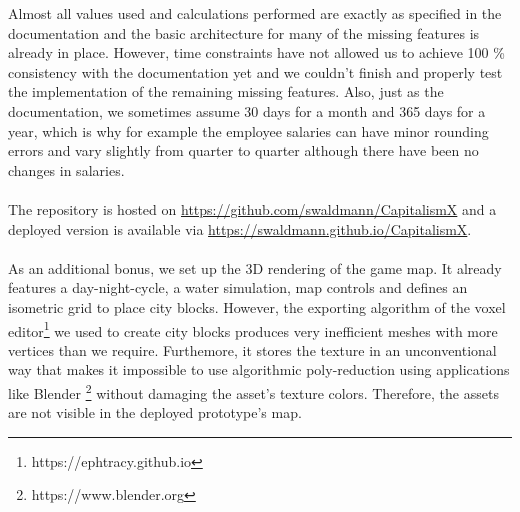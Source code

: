 Almost all values used and calculations performed are exactly as specified in the documentation and the basic architecture for many of the missing features is already in place. However, time constraints have not allowed us to achieve 100 \% consistency with the documentation yet and we couldn't finish and properly test the implementation of the remaining missing features. Also, just as the documentation, we sometimes assume 30 days for a month and 365 days for a year, which is why for example the employee salaries can have minor rounding errors and vary slightly from quarter to quarter although there have been no changes in salaries.\\\\
The repository is hosted on \href{https://github.com/swaldmann/CapitalismX}{https://github.com/swaldmann/CapitalismX} and a deployed version is available via \href{https://swaldmann.github.io/CapitalismX}{https://swaldmann.github.io/CapitalismX}.\\\\
As an additional bonus, we set up the 3D rendering of the game map. It already features a day-night-cycle, a water simulation, map controls and defines an isometric grid to place city blocks.  However,  the  exporting  algorithm  of  the voxel editor\footnote{https://ephtracy.github.io} we used to create city blocks produces very inefficient meshes with more vertices than we require. Furthemore, it stores the texture in an unconventional way that makes it impossible to use algorithmic poly-reduction using applications like Blender \footnote{https://www.blender.org} without damaging the asset's texture colors. Therefore, the assets are not visible in the deployed prototype's map.